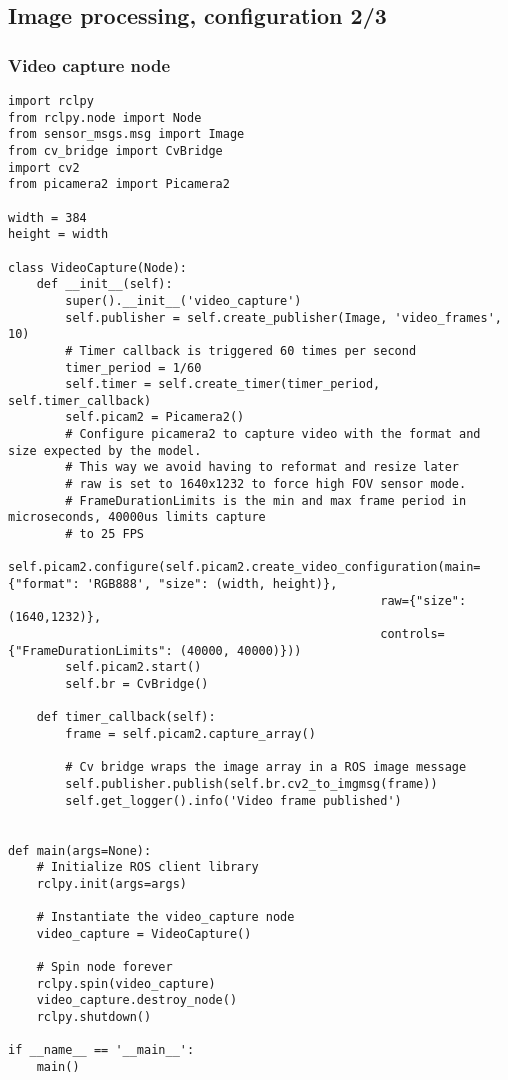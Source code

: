 \subsection{Image processing, configuration 2/3}

\subsubsection{Video capture node}

\begin{lstlisting}[language=PythonPlus, basicstyle=\tiny,]
import rclpy
from rclpy.node import Node
from sensor_msgs.msg import Image
from cv_bridge import CvBridge
import cv2
from picamera2 import Picamera2

width = 384
height = width

class VideoCapture(Node):
    def __init__(self):
        super().__init__('video_capture')
        self.publisher = self.create_publisher(Image, 'video_frames', 10)
        # Timer callback is triggered 60 times per second
        timer_period = 1/60
        self.timer = self.create_timer(timer_period, self.timer_callback)
        self.picam2 = Picamera2()
        # Configure picamera2 to capture video with the format and size expected by the model.
        # This way we avoid having to reformat and resize later
        # raw is set to 1640x1232 to force high FOV sensor mode.
        # FrameDurationLimits is the min and max frame period in microseconds, 40000us limits capture
        # to 25 FPS
        self.picam2.configure(self.picam2.create_video_configuration(main={"format": 'RGB888', "size": (width, height)},
                                                    raw={"size": (1640,1232)},
                                                    controls={"FrameDurationLimits": (40000, 40000)}))
        self.picam2.start()
        self.br = CvBridge()

    def timer_callback(self):
        frame = self.picam2.capture_array()

        # Cv bridge wraps the image array in a ROS image message
        self.publisher.publish(self.br.cv2_to_imgmsg(frame))
        self.get_logger().info('Video frame published')


def main(args=None):
    # Initialize ROS client library
    rclpy.init(args=args)

    # Instantiate the video_capture node
    video_capture = VideoCapture()
    
    # Spin node forever
    rclpy.spin(video_capture)
    video_capture.destroy_node()
    rclpy.shutdown()

if __name__ == '__main__':
    main()


\end{lstlisting}


